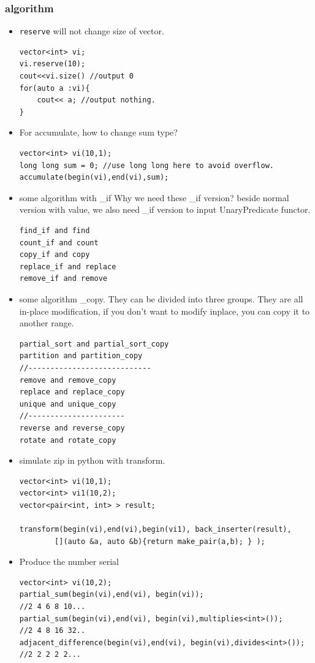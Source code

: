 \documentclass[a4paper,11pt,twoside]{book}
\begin{document}
\subsubsection{algorithm}
\begin{itemize}
\item \texttt{reserve} will not change size of vector. 
\begin{lstlisting}
vector<int> vi;
vi.reserve(10);
cout<<vi.size() //output 0
for(auto a :vi){
	cout<< a; //output nothing.
}
\end{lstlisting}

\item For accumulate, how to change sum type?
\begin{lstlisting}
vector<int> vi(10,1);
long long sum = 0; //use long long here to avoid overflow.
accumulate(begin(vi),end(vi),sum);
\end{lstlisting}

\item some algorithm with \_if  Why we need these \_if version? beside normal version with value, we also need \_if version to input UnaryPredicate functor. 
\begin{lstlisting}
find_if and find
count_if and count
copy_if and copy
replace_if and replace
remove_if and remove
\end{lstlisting}

\item some algorithm \_copy. They can be divided into three groups. They are all in-place modification, if you don't want to modify inplace, you can copy it to another range.
\begin{lstlisting}
partial_sort and partial_sort_copy
partition and partition_copy
//----------------------------
remove and remove_copy
replace and replace_copy
unique and unique_copy
//----------------------
reverse and reverse_copy
rotate and rotate_copy
\end{lstlisting}

\item simulate zip in python with transform.
\begin{lstlisting}
vector<int> vi(10,1);
vector<int> vi1(10,2);
vector<pair<int, int> > result;

transform(begin(vi),end(vi),begin(vi1), back_inserter(result),
        [](auto &a, auto &b){return make_pair(a,b); } );
\end{lstlisting}

\item Produce the number serial
\begin{lstlisting}
vector<int> vi(10,2);
partial_sum(begin(vi),end(vi), begin(vi));
//2 4 6 8 10...
partial_sum(begin(vi),end(vi), begin(vi),multiplies<int>());
//2 4 8 16 32..
adjacent_difference(begin(vi),end(vi), begin(vi),divides<int>());
//2 2 2 2 2...


\end{lstlisting}
\end{itemize}
\end{document}
